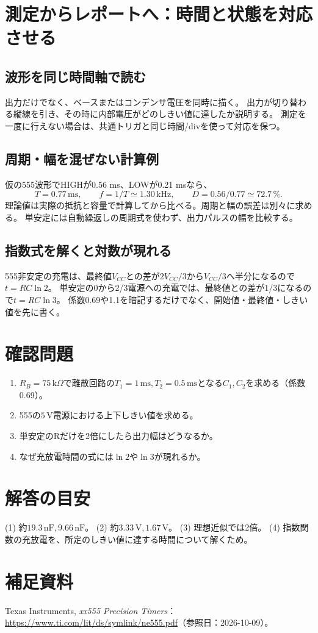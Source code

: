 \documentclass[lualatex,a4paper,10pt]{jlreq}
\begin{document}
\section{測定からレポートへ：時間と状態を対応させる}\label{sec:auto7}
\subsection{波形を同じ時間軸で読む}
出力だけでなく、ベースまたはコンデンサ電圧を同時に描く。
出力が切り替わる縦線を引き、その時に内部電圧がどのしきい値に達したか説明する。
測定を一度に行えない場合は、共通トリガと同じ時間/divを使って対応を保つ。
\subsection{周期・幅を混ぜない計算例}
仮の555波形でHIGHが0.56 ms、LOWが0.21 msなら、
\[
 T=0.77\,\mathrm{ms},\qquad f=1/T\simeq1.30\,\mathrm{kHz},\qquad D=0.56/0.77\simeq72.7\,\%.
\]
理論値は実際の抵抗と容量で計算してから比べる。周期と幅の誤差は別々に求める。
単安定には自動繰返しの周期式を使わず、出力パルスの幅を比較する。
\subsection{指数式を解くと対数が現れる}
555非安定の充電は、最終値$V_{CC}$との差が$2V_{CC}/3$から$V_{CC}/3$へ半分になるので$t=RC\ln2$。
単安定の0から2/3電源への充電では、最終値との差が1/3になるので$t=RC\ln3$。
係数0.69や1.1を暗記するだけでなく、開始値・最終値・しきい値を先に書く。

\clearpage
\section{確認問題}\label{sec:auto8}
\begin{enumerate}
\item $R_B=75\,\mathrm{k}\Omega$で離散回路の$T_1=1\,\mathrm{ms},T_2=0.5\,\mathrm{ms}$となる$C_1,C_2$を求める（係数0.69）。\answerline
\item 555の$5\,\mathrm{V}$電源における上下しきい値を求める。\answerline
\item 単安定のRだけを2倍にしたら出力幅はどうなるか。\answerline
\item なぜ充放電時間の式には$\ln2$や$\ln3$が現れるか。\answerline
\end{enumerate}
\section*{解答の目安}\label{sec:auto9}
(1) 約$19.3\,\mathrm{nF},9.66\,\mathrm{nF}$。
(2) 約$3.33\,\mathrm{V},1.67\,\mathrm{V}$。
(3) 理想近似では2倍。
(4) 指数関数の充放電を、所定のしきい値に達する時間について解くため。
\section*{補足資料}\label{sec:auto10}
Texas Instruments, \textit{xx555 Precision Timers}：
\url{https://www.ti.com/lit/ds/symlink/ne555.pdf}（参照日：2026-10-09）。
\prelabclosing
\end{document}
